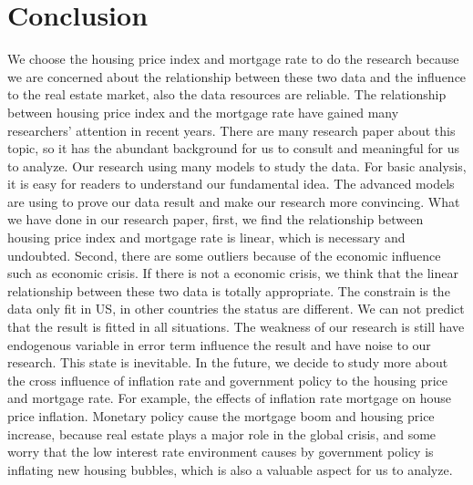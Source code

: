 \documentclass[12pt,letterpaper]{article}
\begin{document}
\section{Conclusion}
We choose the housing price index and mortgage rate to do the research because we are concerned about the relationship between these two data and the influence to the real estate market, also the data resources are reliable. 
The relationship between housing price index and the mortgage rate have gained many researchers’ attention in recent years. There are many research paper about this topic, so it has the abundant background for us to consult and meaningful for us to analyze. 
Our research using many models to study the data. For basic analysis, it is easy for readers to understand our fundamental idea. The advanced models are using to prove our data result and make our research more convincing. 
What we have done in our research paper, first, we find the relationship between housing price index and mortgage rate is linear, which is necessary and undoubted. Second, there are some outliers because of the economic influence such as economic crisis. If there is not a economic crisis, we think that the linear relationship between these two data is totally appropriate.
The constrain is the data only fit in US, in other countries the status are different. We can not predict that the result is fitted in all situations.
The weakness of our research is still have endogenous variable in error term influence the result and have noise to our research. This state is inevitable.
In the future, we decide to study more about the cross influence of inflation rate and government policy to the housing price and mortgage rate. For example, the effects of inflation rate mortgage on house price inflation. Monetary policy cause the mortgage boom and housing price increase, because real estate plays a major role in the global crisis, and some worry that the low interest rate environment causes by government policy is inflating new housing bubbles, which is also a valuable aspect for us to analyze.
\end{document}
